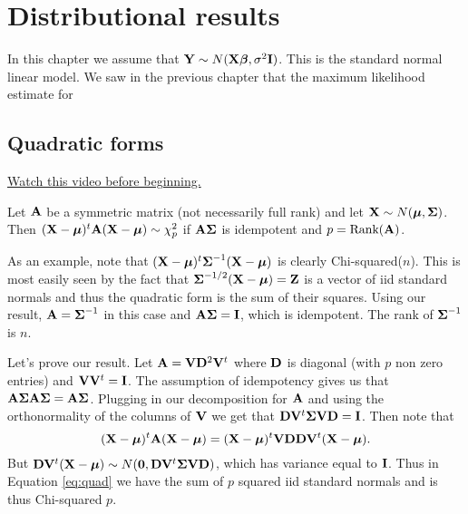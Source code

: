 \chapter{Distributional results}
In this chapter we assume that $\mathbf{Y} \sim N(\mathbf{X} \boldsymbol{\beta}, \sigma^2 \mathbf{I})$. This is the
standard normal linear model. We saw in the previous chapter that the maximum
likelihood estimate for 


\section{Quadratic forms}
\label{sec:qf}

\href{https://www.youtube.com/watch?v=Qx9_Z6khHjA&index=48&list=PLpl-gQkQivXhdgUCdaUQcdb31CRe8Mm2y}{Watch this video before beginning.}

Let $\mathbf{A}$ be a symmetric matrix (not necessarily full rank)
and let $\mathbf{X} \sim N(\boldsymbol{\mu}, \boldsymbol{\Sigma})$. Then
$(\mathbf{X} - \boldsymbol{\mu})^t \mathbf{A} (\mathbf{X} - \boldsymbol{\mu}) \sim \chi^2_{p}$ if 
$\mathbf{A} \boldsymbol{\Sigma}$ is idempotent and $p=\mbox{Rank}(\mathbf{A})$. 

As an example, note that $(\mathbf{X} - \boldsymbol{\mu})^t \boldsymbol{\Sigma}^{-1} (\mathbf{X} - \boldsymbol{\mu})$
is clearly Chi-squared($n$). This is most easily seen by the fact that
$\boldsymbol{\Sigma}^{-1/2}(\mathbf{X} - \boldsymbol{\mu}) = \mathbf{Z}$ is a vector of iid standard normals
and thus the quadratic form is the sum of their squares. Using
our result, $\mathbf{A} = \boldsymbol{\Sigma}^{-1}$ in this case and  
$\mathbf{A} \boldsymbol{\Sigma} = \mathbf{I}$, which is idempotent. The rank of $\boldsymbol{\Sigma}^{-1}$ is $n$.


Let's prove our result. Let $\mathbf{A} = \mathbf{V} \mathbf{D}^2 \mathbf{V}^t$ where $\mathbf{D}$ is diagonal (with $p$ non zero entries)
and $\mathbf{V} \mathbf{V}^t = \mathbf{I}$. The assumption of idempotency gives us that
$\mathbf{A} \boldsymbol{\Sigma} \mathbf{A} \boldsymbol{\Sigma} = \mathbf{A} \boldsymbol{\Sigma}$. Plugging in our decomposition for $\mathbf{A}$
and using the orthonormality of the columns of $\mathbf{V}$ we get that
$\mathbf{D} \mathbf{V}^t \boldsymbol{\Sigma} \mathbf{V} \mathbf{D} = \mathbf{I}$. Then note that
\begin{equation}
\label{eq:quad}
(\mathbf{X} - \boldsymbol{\mu})^t \mathbf{A} (\mathbf{X} - \boldsymbol{\mu}) = (\mathbf{X} - \boldsymbol{\mu})^t \mathbf{V} \mathbf{D}  \mathbf{D} \mathbf{V}^t (\mathbf{X} - \boldsymbol{\mu}).
\end{equation}
But $\mathbf{D} \mathbf{V}^t (\mathbf{X} - \boldsymbol{\mu}) \sim N(\mathbf{0}, \mathbf{D} \mathbf{V}^t \boldsymbol{\Sigma} \mathbf{V} \mathbf{D})$, 
which has variance equal to $\mathbf{I}$. Thus in Equation \eqref{eq:quad} we have
the sum of $p$ squared iid standard normals and is thus Chi-squared $p$. 

